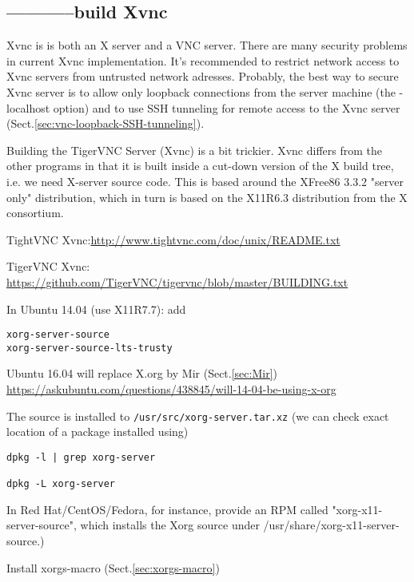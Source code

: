 \subsection{-----------build Xvnc}
\label{sec:Xvnc}

Xvnc is is both an X server and a VNC server.
There are many security problems in current Xvnc implementation.
It's recommended to restrict network access to Xvnc servers from untrusted
network adresses. Probably, the best way to secure Xvnc server is to allow only
loopback connections from the server machine (the -localhost option) and to use
SSH tunneling for remote access to the Xvnc server
(Sect.\ref{sec:vnc-loopback-SSH-tunneling}).   

Building the TigerVNC Server (Xvnc) is a bit trickier.
Xvnc differs from the other programs in that it is built inside a cut-down
version of the X build tree, i.e. we need X-server source code.  This is based
around the XFree86 3.3.2 "server only" distribution, which in turn is based on
the X11R6.3 distribution from the X consortium.


TightVNC Xvnc:\url{http://www.tightvnc.com/doc/unix/README.txt}
 
TigerVNC Xvnc:
\url{https://github.com/TigerVNC/tigervnc/blob/master/BUILDING.txt}
  
In Ubuntu 14.04 (use X11R7.7): add
\begin{verbatim}
xorg-server-source
xorg-server-source-lts-trusty
\end{verbatim}
Ubuntu 16.04 will replace X.org by Mir (Sect.\ref{sec:Mir})
\url{https://askubuntu.com/questions/438845/will-14-04-be-using-x-org}

The source is installed to \verb!/usr/src/xorg-server.tar.xz! (we can check
exact location of a package installed using)
\begin{verbatim}
dpkg -l | grep xorg-server

dpkg -L xorg-server
\end{verbatim}

In Red Hat/CentOS/Fedora, for instance, provide an RPM called
"xorg-x11-server-source", which installs the Xorg source under
/usr/share/xorg-x11-server-source.)

Install xorgs-macro (Sect.\ref{sec:xorgs-macro})

